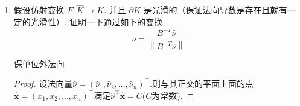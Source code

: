 \documentclass[12pt,a4paper]{article}
\begin{document}
\begin{enumerate}
\begin{proof}
			因为序列 $\left\{v_i\right\}_{i=1}^{+\infty}$ 在 $W^{k+1, p}(\Omega)$ 中有界, 以及 $W^{k+1, p}(\Omega) \stackrel{c}{\hookrightarrow} W^{k, p}(\Omega)$, 由嵌入定理可知, 在 $\left\{v_i\right\}_{i=1}^{+\infty}$ 中存在一个子序列, 仍记为 $\left\{v_i\right\}_{i=1}^{+\infty}$, 以及 $v \in W^{k, p}(\Omega)$, 使得
			
			\begin{equation}
				\lim _{i \rightarrow \infty}\left\|v_i-v\right\|_{k, p, \Omega}=0 .
			\end{equation}
			
			又由 \eqref{eqnorm}, 有
			
			\begin{equation}
				\lim _{i \rightarrow \infty}\left|v_i\right|_{k+1, p, \Omega}=0. 
			\end{equation}
			
			故 $\left\{v_i\right\}_{i=1}^{+\infty}$ 为 $W^{k+1, p}(\Omega)$ 中的 Cauchy 序列, 而 $W^{k+1, p}(\Omega)$ 是完备的, 因此 $\left\{v_i\right\}_{i=1}^{+\infty}$ 在 $W^{k+1, p}(\Omega)$ 中收敛, 从而序列 $\left\{v_i\right\}_{i=1}^{+\infty}$ 的极限 $v$ 满足:
			
			\begin{equation}
				\left|D^\alpha v\right|_{0, p, \Omega}=\lim _{j \rightarrow \infty}\left|D^\alpha v_j\right|_{0, p, \Omega}=0, \quad \forall \alpha \in \mathbb{Z}_{+}^n,|\alpha|=k+1 .
			\end{equation}
			
			
			由此可知 $v$ 是一个次数不超过 $k$ 的多项式. 由 \eqref{eqnorm} 还可知
			
			\begin{equation}
				f_j(v)=\lim _{i \rightarrow \infty} f_j\left(v_i\right)=0, \quad j=1,2, \cdots, N .
			\end{equation}
			
			据定理的条件可知, $v=0$. 这与 \eqref{norm} 式发生了矛盾.
			证毕
			
		\end{proof}
		
		\item 假设仿射变换 $F: \widehat{K} \rightarrow K$. 并且 $\partial K$ 是光滑的（保证法向导数是存在且就有一定的光滑性）. 证明一下通过如下的变换
		$$
		\nu=\frac{B^{-T} \widehat{\nu}}{\left\|B^{-T} \widehat{\nu}\right\|}
		$$
		
		保单位外法向
		
		\begin{proof}
			设法向量$\widehat{\nu}=(\widehat{\nu}_1,\widehat{\nu}_2,...,\widehat{\nu}_n)^\top$.则与其正交的平面上面的点$\widehat{\boldsymbol{x}}=(x_1,x_2,...,x_n)^\top$满足$\widehat{\nu}^\top \widehat{\boldsymbol{x}}=C$($C$为常数).
			

\end{proof}
\end{enumerate}
\end{document}
